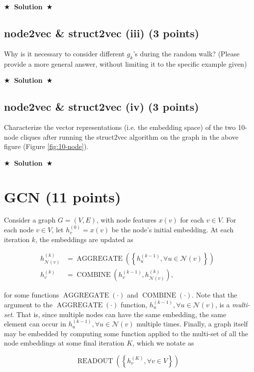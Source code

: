\documentclass{article}
\numberwithin{figure}{section}
\newcommand{\Solution}[1]{%
    {%
        \medskip
        \color{red}
        \bf $\bigstar$~\sf\textbf{Solution}~$\bigstar$ \sf
        #1
    }
    \bigskip
}
\begin{document}
\Solution{}

\subsection{node2vec \& struct2vec (iii) (3 points)}
Why is it necessary to consider different $g_k$'s during the random walk?
(Please provide a more general answer, without limiting it to the specific example given)

\Solution{}

\subsection{node2vec \& struct2vec (iv) (3 points)}
Characterize the vector representations (i.e. the embedding space) of the two 10-node cliques after running the struct2vec algorithm on the graph in the above figure (Figure \ref{fig:10-node}).

\Solution{}



\section{GCN (11 points)}

Consider a graph $G = (V, E)$, with node features $x(v)$ for each $v \in V$. For each node $v \in V$, let $h^{(0)}_v = x(v)$ be the node’s initial embedding. At each iteration $k$, the embeddings are updated as 

$$
\begin{aligned}
h_{\mathcal{N}(v)}^{(k)} & =\operatorname{AGGREGATE}\left(\left\{h_u^{(k-1)}, \forall u \in \mathcal{N}(v)\right\}\right) \\
h_v^{(k)} & =\operatorname{COMBINE}\left(h_v^{(k-1)}, h_{\mathcal{N}(v)}^{(k)}\right),
\end{aligned}
$$

\noindent for some functions $\operatorname{AGGREGATE}(\cdot)$ and $\operatorname{COMBINE}(\cdot)$. Note that the argument to the $\operatorname{AGGREGATE}(\cdot)$ function, ${h^{(k-1)}_u, \forall u \in \mathcal{N}(v)}$, is a \textit{multi-set}.
That is, since multiple nodes can have the same embedding, the same element can occur in ${h^{(k-1)}_u, \forall u \in \mathcal{N}(v)}$ multiple times.
Finally, a graph itself may be embedded by computing some function applied to the multi-set of all the node embeddings at some final iteration $K$, which we notate as 

$$\operatorname { READOUT }\left(\left\{h_v^{(K)}, \forall v \in V\right\}\right)$$
\end{document}
